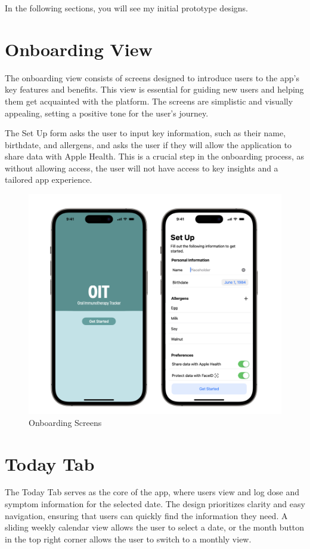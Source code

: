 In the following sections, you will see my initial prototype designs.

\section{Onboarding View}

The onboarding view consists of screens designed to introduce users to the app's key features and benefits. This view is essential for guiding new users and helping them get acquainted with the platform. The screens are simplistic and visually appealing, setting a positive tone for the user's journey.

The Set Up form asks the user to input key information, such as their name, birthdate, and allergens, and asks the user if they will allow the application to share data with Apple Health. This is a crucial step in the onboarding process, as without allowing access, the user will not have access to key insights and a tailored app experience.

\begin{figure}[H]
    \centering
    \includegraphics[width=0.7\linewidth]{thesis//chapters//images/onboarding-screens.png}
    \caption{Onboarding Screens}
    \label{fig:onboarding-screens}
\end{figure}

\section{Today Tab}

The Today Tab serves as the core of the app, where users view and log dose and symptom information for the selected date. The design prioritizes clarity and easy navigation, ensuring that users can quickly find the information they need. A sliding weekly calendar view allows the user to select a date, or the month button in the top right corner allows the user to switch to a monthly view. 

